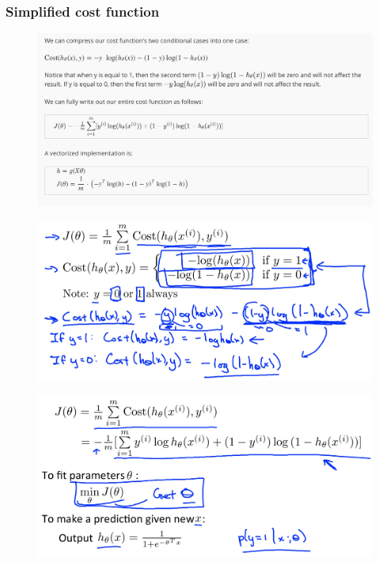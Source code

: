 \documentclass[12pt, A4,onecolumn]{article} %
\begin{document}
\newpage

\subsubsection{Simplified cost function}
\begin{figure}[H]
	\centering
	\includegraphics[width=1\textwidth]{./Imagenes/simpleCostFunc1}
\end{figure}

\begin{figure}[H]
	\centering
	\includegraphics[width=1\textwidth]{./Imagenes/simpleCostFunc2}
\end{figure}

\begin{figure}[H]
	\centering
	\includegraphics[width=1\textwidth]{./Imagenes/simpleCostFunc3}
\end{figure}
\end{document}
